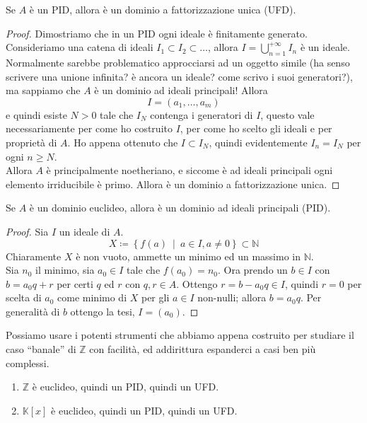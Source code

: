 \begin{teorema}
	Se $A$ è un PID, allora è un dominio a fattorizzazione unica (UFD).
\end{teorema}
\begin{proof}
	Dimostriamo che in un PID ogni ideale è finitamente generato. \\ Consideriamo una catena di ideali $I_1\subset I_2 \subset \dots$, allora $I=\bigcup_{n=1}^{+\infty}I_n$ è un ideale. Normalmente sarebbe problematico approcciarsi ad un oggetto simile (ha senso scrivere una unione infinita? è ancora un ideale? come scrivo i suoi generatori?), ma sappiamo che $A$ è un dominio ad ideali principali! Allora  
	\begin{equation*}
	I = (a_1, \dots, a_m)
	\end{equation*}
	 e quindi esiste $N>0$ tale che $I_N$ contenga i generatori di $I$, questo vale necessariamente per come ho costruito $I$, per come ho scelto gli ideali e per proprietà di $A$. Ho appena ottenuto che $I \subset I_N$, quindi evidentemente $I_n=I_N$ per ogni $n\geq N$. \\ Allora $A$ è principalmente noetheriano, e siccome è ad ideali principali ogni elemento irriducibile è primo. Allora è un dominio a fattorizzazione unica.
\end{proof}
\begin{teorema} 
	Se $A$ è un dominio euclideo, allora è un dominio ad ideali principali (PID).
\end{teorema}
\begin{proof}
	Sia $I$ un ideale di $A$.
	\begin{equation*}
	X \coloneqq \left\{f(a) \ \middle| \ a\in I, a \neq 0\right\}\subset \mathbb{N}
	\end{equation*}
	Chiaramente $X$ è non vuoto, ammette un minimo ed un massimo in $\mathbb{N}$. \\ Sia $n_0$ il minimo, sia $a_0 \in I$ tale che $f(a_0)=n_0$. Ora prendo un $b \in I$ con $b=a_0q+r$ per certi $q$ ed $r$ con $q,r\in A$. Ottengo $r=b-a_0q\in I$, quindi $r=0$ per scelta di $a_0$ come minimo di $X$ per gli $a\in I$ non-nulli; allora $b=a_0q$. Per generalità di $b$ ottengo la tesi, $I=(a_0)$.
\end{proof}
\begin{esempio}
	Possiamo usare i potenti strumenti che abbiamo appena costruito per studiare il caso \enquote{banale} di $\mathbb{Z}$ con facilità, ed addirittura espanderci a casi ben più complessi.
	\begin{enumerate}
		\item $\mathbb{Z}$ è euclideo, quindi un PID, quindi un UFD.
		\item $\mathbb{K}[x]$ è euclideo, quindi un PID, quindi un UFD.
	\end{enumerate}
\end{esempio}
